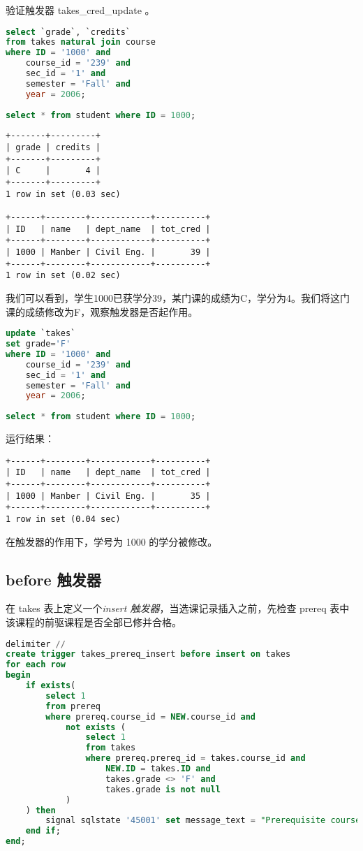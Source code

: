 \documentclass{article}
\begin{document}
验证触发器 takes\_cred\_update 。

\begin{lstlisting}[language=sql]
select `grade`, `credits`
from takes natural join course 
where ID = '1000' and 
	course_id = '239' and 
	sec_id = '1' and 
	semester = 'Fall' and 
	year = 2006;
	
select * from student where ID = 1000;
\end{lstlisting}

\begin{lstlisting}
+-------+---------+
| grade | credits |
+-------+---------+
| C     |       4 |
+-------+---------+
1 row in set (0.03 sec)

+------+--------+------------+----------+
| ID   | name   | dept_name  | tot_cred |
+------+--------+------------+----------+
| 1000 | Manber | Civil Eng. |       39 |
+------+--------+------------+----------+
1 row in set (0.02 sec)
\end{lstlisting}

我们可以看到，学生1000已获学分39，某门课的成绩为C，学分为4。我们将这门课的成绩修改为F，观察触发器是否起作用。

\begin{lstlisting}[language=sql]
update `takes`
set grade='F'
where ID = '1000' and 
	course_id = '239' and 
	sec_id = '1' and 
	semester = 'Fall' and 
	year = 2006;
	
select * from student where ID = 1000;
\end{lstlisting}

运行结果：

\begin{lstlisting}
+------+--------+------------+----------+
| ID   | name   | dept_name  | tot_cred |
+------+--------+------------+----------+
| 1000 | Manber | Civil Eng. |       35 |
+------+--------+------------+----------+
1 row in set (0.04 sec)
\end{lstlisting}

在触发器的作用下，学号为 1000 的学分被修改。

\subsection{before 触发器}

在 takes 表上定义一个\emph{insert 触发器}，当选课记录插入之前，先检查 prereq 表中该课程的前驱课程是否全部已修并合格。

\begin{lstlisting}[language=sql]
delimiter //
create trigger takes_prereq_insert before insert on takes
for each row
begin
	if exists(
		select 1
        from prereq
        where prereq.course_id = NEW.course_id and
			not exists (
				select 1
                from takes
                where prereq.prereq_id = takes.course_id and
					NEW.ID = takes.ID and
					takes.grade <> 'F' and
					takes.grade is not null
            )
    ) then
		signal sqlstate '45001' set message_text = "Prerequisite course not learned.";
    end if;
end;
\end{lstlisting}
\end{document}
